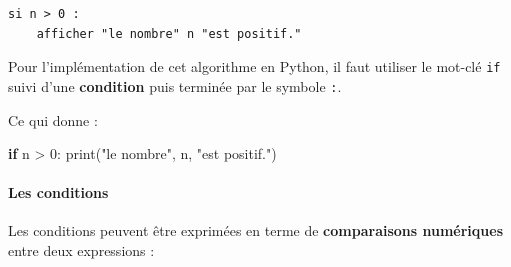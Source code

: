 \documentclass[a4paper,17pt]{extarticle}
\newenvironment{Shaded}{}{}
\newcommand{\DecValTok}[1]{\textcolor[rgb]{0.25,0.63,0.44}{{#1}}}
\newcommand{\StringTok}[1]{\textcolor[rgb]{0.25,0.44,0.63}{{#1}}}
\newcommand{\NormalTok}[1]{{#1}}
\newcommand{\ControlFlowTok}[1]{\textcolor[rgb]{0.00,0.44,0.13}{\textbf{{#1}}}}
\newcommand{\OperatorTok}[1]{\textcolor[rgb]{0.40,0.40,0.40}{{#1}}}
\newcommand{\BuiltInTok}[1]{{#1}}
\begin{document}
\begin{verbatim}
si n > 0 :
    afficher "le nombre" n "est positif."
\end{verbatim}

Pour l'implémentation de cet algorithme en Python, il faut utiliser le
mot-clé \texttt{if} suivi d'une \textbf{condition} puis terminée par le
symbole \texttt{:}.

Ce qui donne :

\begin{Shaded}
\begin{Highlighting}[]
\ControlFlowTok{if}\NormalTok{ n }\OperatorTok{\textgreater{}} \DecValTok{0}\NormalTok{:}
    \BuiltInTok{print}\NormalTok{(}\StringTok{"le nombre"}\NormalTok{, n, }\StringTok{"est positif."}\NormalTok{)}
\end{Highlighting}
\end{Shaded}

    \hypertarget{les-conditions}{%
\paragraph{Les conditions}\label{les-conditions}}

Les conditions peuvent être exprimées en terme de \textbf{comparaisons
numériques} entre deux expressions :
\end{document}
